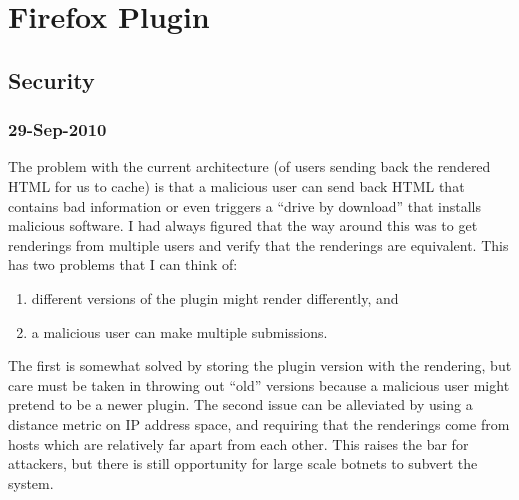 \chapter{Firefox Plugin}

\section{Security}

\subsection{29-Sep-2010}

The problem with the current architecture (of users sending back the
rendered HTML for us to cache) is that a malicious user can send back
HTML that contains bad information or even triggers a ``drive by
download'' that installs malicious software.
I had always figured that the way around this was to get renderings
from multiple users and verify that the renderings are equivalent.
This has two problems that I can think of:
\begin{enumerate}
\item different versions of the plugin might render differently, and
\item a malicious user can make multiple submissions.
\end{enumerate}
The first is somewhat solved by storing the plugin version with the
rendering, but care must be taken in throwing out ``old'' versions
because a malicious user might pretend to be a newer plugin.
The second issue can be alleviated by using a distance metric on
IP address space, and requiring that the renderings come from hosts
which are relatively far apart from each other.
This raises the bar for attackers, but there is still opportunity
for large scale botnets to subvert the system.

